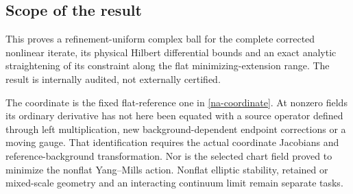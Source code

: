 \subsection{Scope of the result}
\label{na-scope}

This proves a refinement-uniform complex ball for the complete
corrected nonlinear iterate, its physical Hilbert differential
bounds and an exact analytic straightening of its constraint along
the flat minimizing-extension range. The result is internally
audited, not externally certified.

The coordinate is the fixed flat-reference one in
\eqref{na-coordinate}. At nonzero fields its ordinary derivative
has not here been equated with a source operator defined through
left multiplication, new background-dependent endpoint corrections
or a moving gauge. That identification requires the actual
coordinate Jacobians and reference-background transformation.
Nor is the selected chart field proved to minimize the nonflat
Yang--Mills action. Nonflat elliptic stability, retained or
mixed-scale geometry and an interacting continuum limit remain
separate tasks.
